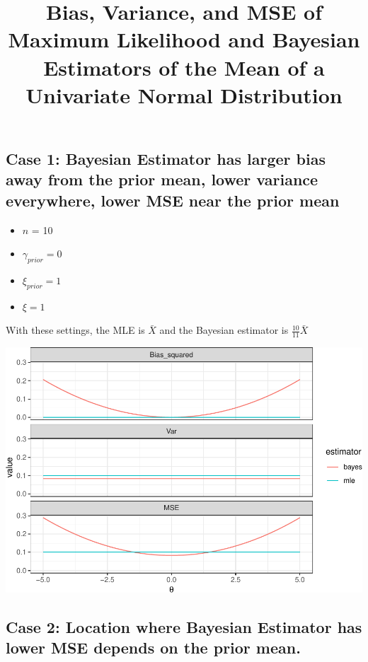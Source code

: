 \documentclass[]{article}
\title{Bias, Variance, and MSE of Maximum Likelihood and Bayesian Estimators of
the Mean of a Univariate Normal Distribution}
\author{}
\date{}
\providecommand{\tightlist}{%
  \setlength{\itemsep}{0pt}\setlength{\parskip}{0pt}}
\begin{document}
\maketitle

\def\simiid{\stackrel{{\mbox{\text{\tiny i.i.d.}}}}{\sim}}

\subsection{Case 1: Bayesian Estimator has larger bias away from the
prior mean, lower variance everywhere, lower MSE near the prior
mean}\label{case-1-bayesian-estimator-has-larger-bias-away-from-the-prior-mean-lower-variance-everywhere-lower-mse-near-the-prior-mean}

\begin{itemize}
\tightlist
\item
  \(n\) = 10
\item
  \(\gamma_{prior} = 0\)
\item
  \(\xi_{prior} = 1\)
\item
  \(\xi = 1\)
\end{itemize}

With these settings, the MLE is \(\bar{X}\) and the Bayesian estimator
is \(\frac{10}{11} \bar{X}\)

\includegraphics{20190426_normal_univar_bayes_files/figure-latex/unnamed-chunk-1-1.pdf}

\newpage

\subsection{Case 2: Location where Bayesian Estimator has lower MSE
depends on the prior
mean.}\label{case-2-location-where-bayesian-estimator-has-lower-mse-depends-on-the-prior-mean.}
\end{document}
